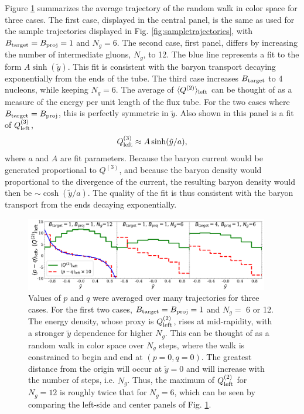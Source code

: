 \documentclass[aps, prc, 12pt, nofootinbib, showpacs, superscriptaddress, tightenlines, groupedaddress]{revtex4-2}
\begin{document}
Figure \ref{fig:averagetrajectory} summarizes the average trajectory of the random walk in color space for three cases. The first case, displayed in the central panel, is the same as used for the sample trajectories displayed in Fig. \ref{fig:sampletrajectories}, with $B_{\rm target}=B_{\rm proj}=1$ and $N_g=6$. The second case, first panel, differs by increasing the number of intermediate gluons, $N_g$, to 12. The blue line represents a fit to the form $A\sinh(\tilde{y})$. This fit is consistent with the baryon transport decaying exponentially from the ends of the tube. The third case increases $B_{\rm target}$ to 4 nucleons, while keeping $N_g=6$. The average of $\langle Q^{(2)}\rangle_{\rm left}$ can be thought of as a measure of the energy per unit length of the flux tube. For the two cases where $B_{\rm target}=B_{\rm proj}$, this is perfectly symmetric in $\tilde{y}$. Also shown in this panel is a fit of $Q^{(3)}_{\rm left}$,
\begin{eqnarray}
Q^{(3)}_{\rm left}\approx A\sinh(\tilde{y}/a),
\end{eqnarray}
where $a$ and $A$ are fit parameters. Because the baryon current would be generated proportional to $Q^{(3)}$, and because the baryon density would proportional to the divergence of the current, the resulting baryon density would then be $\sim \cosh(\tilde{y}/a)$. The quality of the fit is thus consistent with the baryon transport from the ends decaying exponentially.
\begin{figure}
\centerline{\includegraphics[width=0.95\textwidth]{figs/average_trajectory.pdf}}
\caption{\label{fig:averagetrajectory}
Values of $p$ and $q$ were averaged over many trajectories for three cases. For the first two cases, $B_{\rm target}=B_{\rm proj}=1$ and $N_g=$ 6 or 12. The energy density, whose proxy is $Q^{(2)}_{\rm left}$, rises at mid-rapidity, with a stronger $\tilde{y}$ dependence for higher $N_g$. This can be thought of as a random walk in color space over $N_g$ steps, where the walk is constrained to begin and end at $(p=0,q=0)$. The greatest distance from the origin will occur at $\tilde{y}=0$ and will increase with the number of steps, i.e. $N_g$. Thus, the maximum of $Q^{(2)}_{\rm left}$ for $N_g=12$ is roughly twice that for $N_g=6$, which can be seen by comparing the left-side and center panels of Fig. \ref{fig:averagetrajectory}. 
}
\end{figure}
\end{document}
